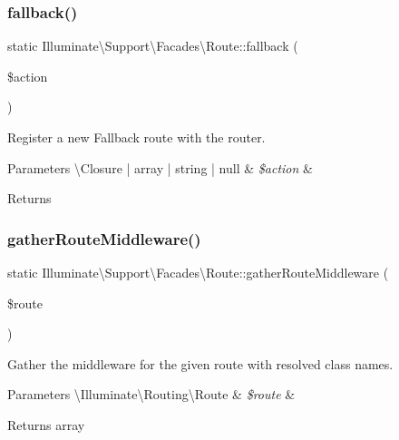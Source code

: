 \subsubsection{\texorpdfstring{fallback()}{fallback()}}
{\footnotesize\ttfamily static Illuminate\textbackslash{}\+Support\textbackslash{}\+Facades\textbackslash{}\+Route\+::fallback (\begin{DoxyParamCaption}\item[{}]{\$action }\end{DoxyParamCaption})\hspace{0.3cm}{\ttfamily [static]}}

Register a new Fallback route with the router.


\begin{DoxyParams}[1]{Parameters}
\textbackslash{}\+Closure | array | string | null & {\em \$action} & \\
\hline
\end{DoxyParams}
\begin{DoxyReturn}{Returns}

\end{DoxyReturn}
\mbox{\label{class_illuminate_1_1_support_1_1_facades_1_1_route_ad8d94099c533eb3f93a4fa0884e69716}} 
\subsubsection{\texorpdfstring{gather\+Route\+Middleware()}{gatherRouteMiddleware()}}
{\footnotesize\ttfamily static Illuminate\textbackslash{}\+Support\textbackslash{}\+Facades\textbackslash{}\+Route\+::gather\+Route\+Middleware (\begin{DoxyParamCaption}\item[{}]{\$route }\end{DoxyParamCaption})\hspace{0.3cm}{\ttfamily [static]}}

Gather the middleware for the given route with resolved class names.


\begin{DoxyParams}[1]{Parameters}
\textbackslash{}\+Illuminate\textbackslash{}\+Routing\textbackslash{}\+Route & {\em \$route} & \\
\hline
\end{DoxyParams}
\begin{DoxyReturn}{Returns}
array 
\end{DoxyReturn}
\mbox{\label{class_illuminate_1_1_support_1_1_facades_1_1_route_a39cd5af406f569f04257beadad32f22a}} 
